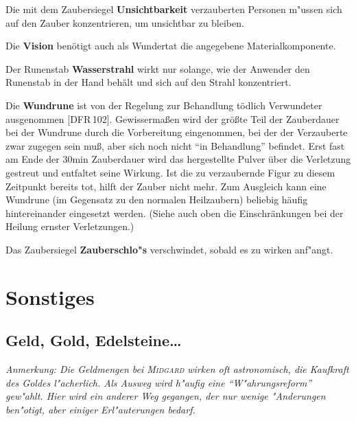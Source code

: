 \documentclass[10pt,a4paper,germanpar]{article}
\begin{document}
%

Die mit dem Zaubersiegel \textbf{Unsichtbarkeit} verzauberten Personen 
m"ussen sich auf den Zauber konzentrieren, um unsichtbar zu bleiben.

Die \textbf{Vision} benötigt auch als Wundertat die angegebene
Materialkomponente.

Der Runenstab \textbf{Wasserstrahl} wirkt nur solange, wie der
Anwender den Runenstab in der Hand behält und sich auf den Strahl
konzentriert.

Die \textbf{Wundrune} ist von der Regelung zur Behandlung tödlich
Verwundeter ausgenommen [DFR\,102]. Gewissermaßen wird der größte Teil
der Zauberdauer bei der Wundrune durch die Vorbereitung eingenommen,
bei der der Verzauberte zwar zugegen sein muß, aber sich noch nicht
"`in Behandlung"' befindet. Erst fast am Ende der 30min Zauberdauer
wird das hergestellte Pulver über die Verletzung gestreut und
entfaltet seine Wirkung. Ist die zu verzaubernde Figur zu diesem
Zeitpunkt bereits tot, hilft der Zauber nicht mehr. Zum Ausgleich kann
eine Wundrune (im Gegensatz zu den normalen Heilzaubern) beliebig
häufig hintereinander eingesetzt werden. (Siehe auch oben die
Einschränkungen bei der Heilung ernster Verletzungen.)

Das Zaubersiegel \textbf{Zauberschlo"s} verschwindet, sobald es zu
wirken anf"angt.

\section{Sonstiges}

\subsection{Geld, Gold, Edelsteine\dots}

\emph{Anmerkung: Die Geldmengen bei \textsc{Midgard} wirken oft
  astronomisch, die Kaufkraft des Goldes l"acherlich. Als Ausweg wird
  h"aufig eine "`W"ahrungsreform"' gew"ahlt. Hier wird ein anderer Weg
  gegangen, der nur wenige "Anderungen ben"otigt, aber einiger
  Erl"auterungen bedarf.}
\end{document}
